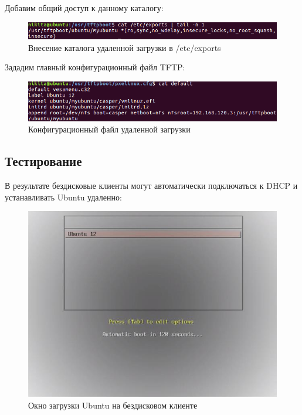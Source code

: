 \documentclass[14pt,a4paper,report]{report}
\begin{document}
\clearpage

Добавим общий доступ к данному каталогу:

\begin{figure}[h!]
	\centering
	\includegraphics[scale = 0.85]{images/2_5.png}
	\caption{Внесение каталога удаленной загрузки в /etc/exports}
	\label{image:10}
\end{figure}

Зададим главный конфигурационный файл TFTP:

\begin{figure}[h!]
	\centering
	\includegraphics[scale = 0.85]{images/2_6.png}
	\caption{Конфигурационный файл удаленной загрузки}
	\label{image:11}
\end{figure}

\subsection{Тестирование}

В результате бездисковые клиенты могут автоматически подключаться к DHCP и устанавливать Ubuntu удаленно:

\begin{figure}[h!]
	\centering
	\includegraphics[scale = 0.85]{images/2_7.png}
	\caption{Окно загрузки Ubuntu на бездисковом клиенте}
	\label{image:12}
\end{figure}
\end{document}
